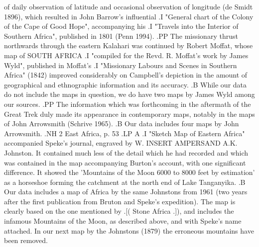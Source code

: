 \documentclass[12pt]{article}
\begin{document}
of daily observation of latitude and occasional observation of longitude (de
Smidt 1896), which resulted in John Barrow's influential 
.I "General chart of the Colony of the Cape of Good Hope",
accompanying his 
.I "Travels into the Interior of Southern Africa",
published in 1801 (Penn 1994).
.PP
The missionary thrust northwards through the eastern Kalahari was continued by 
Robert Moffat, whose map of SOUTH AFRICA 
.I "compiled for the Revd. R. Moffat's work by James Wyld",
published in Moffat's 
.I "Missionary Labours and Scenes in Southern Africa"
(1842) improved considerably on Campbell's depiction in the amount of
geographical and ethnographic information and its accuracy.
.B
While our data do not include the maps in question, we do have two maps by James
Wyld among our sources.
.PP
The information which was forthcoming in the aftermath of the Great Trek duly
made its appearance in contemporary maps, notably in the maps of John Arrowsmith
(Schrive 1965).
.B
Our data includes four maps by John Arrowsmith.
.NH 2
East Africa, p. 53
.LP
A
.I "Sketch Map of Eastern Africa"
accompanied Speke's journal, engraved by W. INSERT AMPERSAND A.K. Johnston. It contained much
less of the detail which he had recorded and which was contained in the map
accompanying Burton's account, with one significant difference. It showed the 'Mountains
of the Moon 6000 to 8000 feet by estimation' as a horseshoe forming
the catchment at the north end of Lake Tanganyika.
.B
Our data includes a map of Africa by the same Johnstons from 1961 (two years
after the first publication from Bruton and Speke's expedition). The map is
clearly based on the one mentioned by 
.[(
Stone Africa
.]),
and includes the infamous Mountains of the Moon, as described above, and with
Speke's name attached. In our next map by the Johnstons (1879) the erroneous 
mountains have been removed.

\pagebreak



\end{document}
